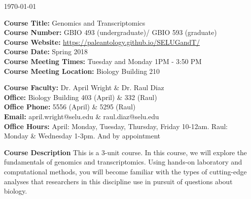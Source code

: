\documentclass[12pt]{article}
\let\oldtextbf\textbf
\renewcommand{\textbf}[1]{\textcolor{coolblack}{\oldtextbf{#1}}}
\begin{document}
\thispagestyle{fancy}
\begin{flushright}
\today
\end{flushright}
\vspace{2mm}
\begin{flushleft}
\textbf{Course Title:} Genomics and Transcriptomics \\
\textbf{Course Number:} GBIO 493 (undergraduate)/ GBIO 593 (graduate)\\
\textbf{Course Website:}  \url{https://paleantology.github.io/SELUGandT/} \\

\textbf{Course Date:} Spring 2018 \\

\textbf{Course Meeting Times:} Tuesday and Monday 1PM - 3:50 PM \\
\textbf{Course Meeting Location:} Biology Building 210 \\
\end{flushleft}

\bigskip

\begin{flushleft}
\textbf{Course Faculty:} Dr. April Wright \& Dr. Raul Diaz \\
\textbf{Office:} Biology Building 403 (April) \&  332 (Raul)\\
\textbf{Office Phone:} 5556 (April) \& 5295 (Raul) \\
\textbf{Email:} april.wright@selu.edu \& raul.diaz@selu.edu  \\
\textbf{Office Hours:} April: Monday, Tuesday, Thursday, Friday 10-12am. Raul: Monday & Wednesday 1-3pm. And by appointment \\

\end{flushleft}

\bigskip

\begin{flushleft}

\textbf{Course Description}
This is a 3-unit course. In this course, we will explore the fundamentals of genomics and transcriptomics. Using hands-on laboratory and computational methods, you will become familiar with the types of cutting-edge analyses that researchers in this discipline use in pursuit of questions about biology.

\end{flushleft}
\end{document}
